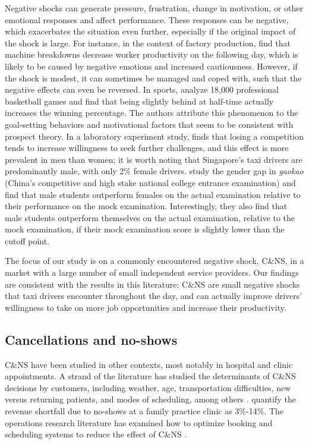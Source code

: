\documentclass[reviewmode]{restat}
\begin{document}
Negative shocks can generate pressure, frustration, change in motivation, or other emotional responses
and affect performance.  These responses can be negative, which exacerbates the situation even further,
especially if the original impact of the shock is large. For instance, in the context of factory production,
\citet{cai2017recover} find that machine breakdowns decrease worker productivity on the following day, which
is likely to be caused by negative emotions and increased cautiousness. However, if the shock is modest,
it can sometimes be managed and coped with, such that the negative effects can even be reversed. 
In sports, \citet{berger2011can} analyze 18,000 professional basketball games and find that being slightly
behind at half-time actually increases the winning percentage. The authors attribute this phenomenon to 
the goal-setting behaviors and motivational factors that seem to be consistent with prospect theory. 
In a laboratory experiment study, \citet{buser2016impact}  finds that losing a competition tends to 
increase willingness to seek further challenges, and this effect is more prevalent in men than women;
it is worth noting that Singapore's taxi drivers are predominantly male, with only 2\% female drivers.
\citet{cai2016gender} study the gender gap in \emph{gaokao} (China's competitive and high stake national
college entrance examination) and find that male students outperform females on the actual examination
relative to their performance on the mock examination. Interestingly, they also find that male students 
outperform themselves on the actual examination, relative to the mock examination, 
if their mock examination score is slightly lower than the cutoff point. 


The focus of our study is on a commonly encountered negative shock, C\&NS, in a market with a large number
of small independent service providers. Our findings are consistent with the results in this literature:
C\&NS are small negative shocks that taxi drivers encounter throughout the day,
and can actually improve drivers' willingness to take on more job opportunities and increase their productivity.

\subsection{Cancellations and no-shows}

C\&NS have been studied in other contexts, most notably in hospital and clinic appointments. 
A strand of the literature has studied the determinants of C\&NS decisions by customers, 
including weather, age, transportation difficulties, new versus returning patients, 
and modes of scheduling, among others \citep{norris2014empirical}. \citet{moore2001time} quantify the
revenue shortfall due to no-shows at a family practice clinic as 3\%-14\%. The operations research 
literature has examined how to optimize booking and scheduling systems to reduce the effect of C\&NS
\citep{feldman2014appointment,patrick2008reducing}.
\end{document}
